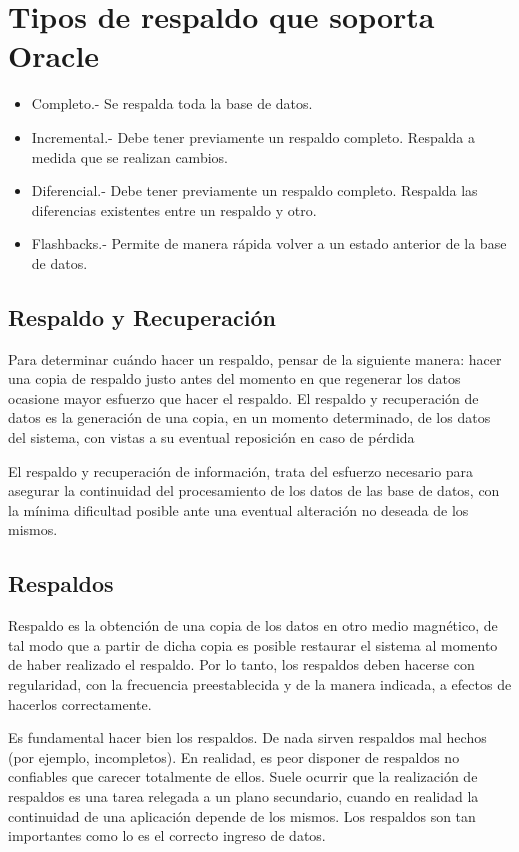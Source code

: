 \section{Tipos de respaldo que soporta Oracle}
\begin{itemize}
\item
Completo.- Se respalda toda la base de datos.
\item
Incremental.- Debe tener previamente un respaldo completo. Respalda a medida que se realizan cambios.
\item
Diferencial.- Debe tener previamente un respaldo completo. Respalda las diferencias existentes entre un respaldo y otro.
\item
Flashbacks.- Permite de manera rápida volver a un estado anterior de la base de datos.
\end{itemize}


\subsection{Respaldo y Recuperación}


Para determinar cuándo hacer un respaldo, pensar de la siguiente manera: hacer una copia de respaldo justo antes del momento en que regenerar los datos ocasione mayor esfuerzo que hacer el respaldo.
El respaldo y recuperación de datos es la generación de una copia, en un momento determinado, de los datos del sistema, con vistas a su eventual reposición en caso de pérdida

El respaldo y recuperación de información, trata del esfuerzo necesario para asegurar la continuidad del procesamiento de los datos de las base de datos, con la mínima dificultad posible ante una eventual alteración no deseada de los mismos.

\subsection{Respaldos}

Respaldo es la obtención de una copia de los datos en otro medio magnético, de tal modo que a partir de dicha copia es posible restaurar el sistema al momento de haber realizado el respaldo. Por lo tanto, los respaldos deben hacerse con regularidad, con la frecuencia preestablecida y de la manera indicada, a efectos de hacerlos correctamente.

Es fundamental hacer bien los respaldos. De nada sirven respaldos mal hechos (por ejemplo, incompletos). En realidad, es peor disponer de respaldos no confiables que carecer totalmente de ellos. Suele ocurrir que la realización de respaldos es una tarea relegada a un plano secundario, cuando en realidad la continuidad de una aplicación depende de los mismos. Los respaldos son tan importantes como lo es el correcto ingreso de datos.




